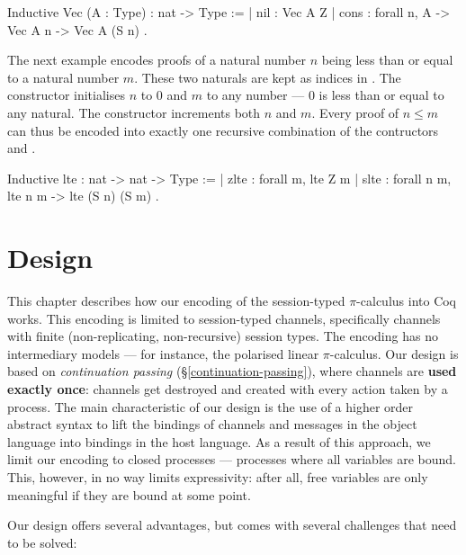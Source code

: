 \documentclass{mproj}
\newcommand{\picalc}{$\pi$-calculus}
\begin{document}
\begin{coq}
    Inductive Vec (A : Type) : nat -> Type :=
    | nil  : Vec A Z
    | cons : forall {n}, A -> Vec A n -> Vec A (S n)
    .
\end{coq}

The next example encodes proofs of a natural number $n$ being less than or equal to a natural number $m$. These two naturals are kept as indices in . The constructor  initialises $n$ to 0 and $m$ to any number --- 0 is less than or equal to any natural. The constructor  increments both $n$ and $m$. Every proof of $n \leq m$ can thus be encoded into exactly one recursive combination of the contructors  and .

\begin{coq}
    Inductive lte : nat -> nat -> Type :=
    | zlte : forall {m}, lte Z m
    | slte : forall {n m}, lte n m -> lte (S n) (S m)
    .
\end{coq}

\chapter{Design}\label{design}

This chapter describes how our encoding of the session-typed \picalc{} into Coq works. This encoding is limited to session-typed channels, specifically channels with finite (non-replicating, non-recursive) session types. The encoding has no intermediary models --- for instance, the polarised linear \picalc{}. Our design is based on \emph{continuation passing} (\S \ref{continuation-passing}), where channels are \textbf{used exactly once}: channels get destroyed and created with every action taken by a process.  The main characteristic of our design is the use of a higher order abstract syntax to lift the bindings of channels and messages in the object language into bindings in the host language. As a result of this approach, we limit our encoding to closed processes --- processes where all variables are bound. This, however, in no way limits expressivity: after all, free variables are only meaningful if they are bound at some point.

Our design offers several advantages, but comes with several challenges that need to be solved:
\end{document}
